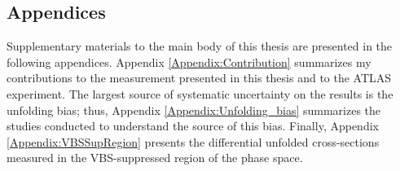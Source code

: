 \documentclass[red]{brandeis-dissertation}
\numberwithin{equation}{section}
\begin{document}

\clearpage


	
	
	
	
\clearpage


	
	
	
	
\clearpage


	
	
	
	
	
	
\clearpage


\clearpage


\clearpage


\clearpage

% 
% 	
% 	

{\singlespacing
\renewcommand{\refname}{References}


\clearpage
}

\begin{appendices}
    \part*{\LARGE{Appendices}}
	Supplementary materials to the main body of this thesis are presented in the following appendices. Appendix \ref{Appendix:Contribution} summarizes my contributions to the measurement presented in this thesis and to the ATLAS experiment. The largest source of systematic uncertainty on the results is the unfolding bias; thus, Appendix \ref{Appendix:Unfolding_bias} summarizes the studies conducted to understand the source of this bias. Finally, Appendix \ref{Appendix:VBSSupRegion} presents the differential unfolded cross-sections measured in the VBS-suppressed region of the phase space. 

	
\end{appendices}
\end{document}
